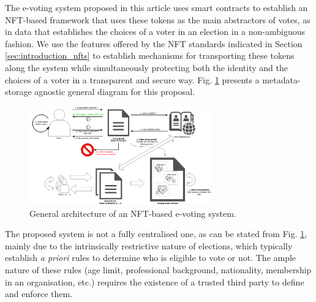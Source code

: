 \documentclass[../main.tex]{subfiles}
\begin{document}
The e-voting system proposed in this article uses smart contracts to establish an NFT-based framework that uses these tokens as the main abstractors of votes, as in data that establishes the choices of a voter in an election in a non-ambiguous fashion. We use the features offered by the NFT standards indicated in Section \ref{sec:introduction_nfts} to establish mechanisms for transporting these tokens along the system while simultaneously protecting both the identity and the choices of a voter in a transparent and secure way. Fig. \ref{fig:general_architecture} presents a metadata-storage agnostic general diagram for this proposal.

\begin{figure}[htp]
    \centering
    \includegraphics[width=0.7\textwidth]{../Images/01_general_solution.png}
    \caption{General architecture of an NFT-based e-voting system.}
    \label{fig:general_architecture}
\end{figure}

The proposed system is not a fully centralised one, as can be stated from Fig. \ref{fig:general_architecture}, mainly due to the intrinsically restrictive nature of elections, which typically establish \textit{a priori} rules to determine who is eligible to vote or not. The ample nature of these rules (age limit, professional background, nationality, membership in an organisation, etc.) requires the existence of a trusted third party to define and enforce them.
\end{document}
